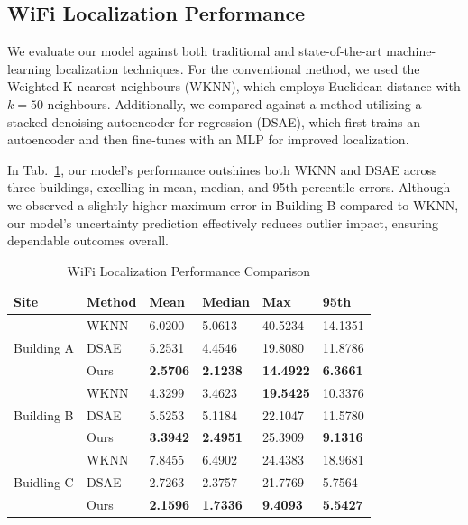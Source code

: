 \subsection{WiFi Localization Performance}

We evaluate our model against both traditional and state-of-the-art machine-learning localization techniques. For the conventional method, we used the Weighted K-nearest neighbours (WKNN)\cite{wknn2004he}, which employs Euclidean distance with \(k=50\) neighbours. Additionally, we compared against a method utilizing a stacked denoising autoencoder for regression (DSAE)\cite{DSAE2019wa}, which first trains an autoencoder and then fine-tunes with an MLP for improved localization.

In Tab.~\ref{tab:wifi-results}, our model's performance outshines both WKNN and DSAE across three buildings, excelling in mean, median, and 95th percentile errors. Although we observed a slightly higher maximum error in Building B compared to WKNN, our model's uncertainty prediction effectively reduces outlier impact, ensuring dependable outcomes overall.

\begin{table}[!h]
    \centering
    \caption{WiFi Localization Performance Comparison}
    \label{tab:wifi-results}
    \begin{threeparttable}
    \begin{tabular}{llllll} 
    \hline
    Site & Method & Mean & Median & Max & 95th \\ 
    \hline
    \multirow{3}{*}{Building A} & WKNN\cite{wknn2004he}& 6.0200 & 5.0613 & 40.5234 & 14.1351 \\
    & DSAE\cite{DSAE2019wa}& 5.2531 & 4.4546 & 19.8080 & 11.8786 \\
    & Ours & \textbf{2.5706} & \textbf{2.1238} & \textbf{14.4922} & \textbf{6.3661} \\ 
    \hline
    \multirow{3}{*}{Building B} & WKNN\cite{wknn2004he}& 4.3299 & 3.4623 & \textbf{19.5425} & 10.3376 \\
    & DSAE\cite{DSAE2019wa}& 5.5253 & 5.1184 & 22.1047 & 11.5780 \\
    & Ours & \textbf{3.3942} & \textbf{2.4951} & 25.3909 & \textbf{9.1316} \\ 
    \hline
    \multirow{3}{*}{Buidling C} & WKNN \cite{wknn2004he} & 7.8455 & 6.4902 & 24.4383 & 18.9681 \\
    & DSAE \cite{DSAE2019wa} & 2.7263 & 2.3757 & 21.7769 & 5.7564 \\
    & Ours &\textbf{2.1596} & \textbf{1.7336} & \textbf{9.4093} & \textbf{5.5427} \\
    \hline
    \end{tabular}
    \end{threeparttable}
    
\end{table}



